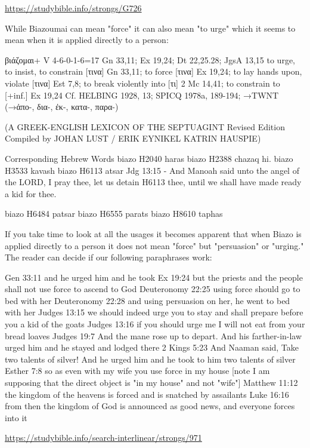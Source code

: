 \documentclass[11pt]{article}
\begin{document}
\url{https://studybible.info/strongs/G726}


While Biazoumai can mean "force" it can also mean "to urge" which it seems to mean when it is applied directly to a person:

\begin{greek}
βιάζομαι+ V 4-6-0-1-6=17
Gn 33,11; Ex 19,24; Dt 22,25.28; JgsA 13,15
to urge, to insist, to constrain [τινα] Gn 33,11; to force [τινα] Ex 19,24; to lay hands upon, violate [τινα]
Est 7,8; to break violently into [τι] 2 Mc 14,41; to constrain to [+inf.] Ex 19,24
Cf. HELBING 1928, 13; SPICQ 1978a, 189-194; →TWNT
(→ἀπο-, δια-, ἐκ-, κατα-, παρα-) 
\end{greek}
(A GREEK-ENGLISH LEXICON
OF THE SEPTUAGINT
Revised Edition
Compiled by
JOHAN LUST / ERIK EYNIKEL
KATRIN HAUSPIE)

Corresponding Hebrew Words
biazo H2040 haras
biazo H2388 chazaq hi.
biazo H3533 kavash
biazo H6113 atsar
Jdg 13:15 - And Manoah said unto the angel of the LORD, I pray thee, let us detain H6113 thee, until we shall have made ready a kid for thee.

biazo H6484 patsar
biazo H6555 parats
biazo H8610 taphas



If you take time to look at all the usages it becomes apparent that when Biazo is applied directly to a person it does not mean "force" but "persuasion" or "urging." The reader can decide if our following paraphrases work:

Gen 33:11 and he urged him and he took
Ex 19:24 but the priests and the people shall not use force to ascend to God
Deuteronomy 22:25 using force should go to bed with her
Deuteronomy 22:28 and using persuasion on her, he went to bed with her
Judges 13:15 we should indeed urge you to stay and shall prepare before you a kid of the goats
Judges 13:16 if you should urge me I will not eat from your bread loaves
Judges 19:7 And the mane rose up to depart. And his farther-in-law urged him and he stayed and lodged there
2 Kings 5:23 And Naaman said, Take two talents of silver! And he urged him and he took to him two talents of silver
Esther 7:8 so as even with my wife you use force in my house [note I am supposing that the direct object is "in my house" and not "wife"]
Matthew 11:12 the kingdom of the heavens is forced and is snatched by assailants
Luke 16:16 from then the kingdom of God is announced as good news, and everyone forces into it

\url{https://studybible.info/search-interlinear/strongs/971}
\end{document}
